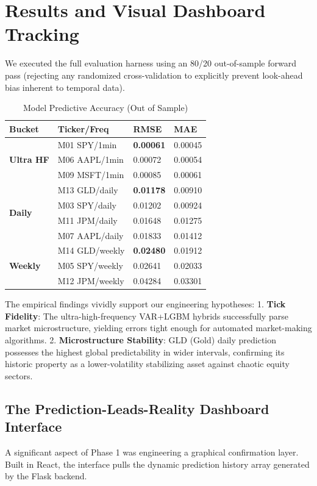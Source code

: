 \documentclass[journal,10pt,twocolumn]{IEEEtran}
\begin{document}
\section{Results and Visual Dashboard Tracking}
\label{sec:results}

We executed the full evaluation harness using an 80/20 out-of-sample forward pass (rejecting any randomized cross-validation to explicitly prevent look-ahead bias inherent to temporal data).

\begin{table}[ht]
\centering
\caption{Model Predictive Accuracy (Out of Sample)}
\label{tab:results_accuracy}
\begin{tabular}{@{}llll@{}}
\toprule
\textbf{Bucket} & \textbf{Ticker/Freq} & \textbf{RMSE} & \textbf{MAE} \\
\midrule
\multirow{3}{*}{\textbf{Ultra HF}} 
& M01 SPY/1min & \textbf{0.00061} & 0.00045 \\
& M06 AAPL/1min & 0.00072 & 0.00054 \\
& M09 MSFT/1min & 0.00085 & 0.00061 \\
\midrule
\multirow{4}{*}{\textbf{Daily}} 
& M13 GLD/daily & \textbf{0.01178} & 0.00910 \\
& M03 SPY/daily & 0.01202 & 0.00924 \\
& M11 JPM/daily & 0.01648 & 0.01275 \\
& M07 AAPL/daily& 0.01833 & 0.01412 \\
\midrule
\multirow{3}{*}{\textbf{Weekly}} 
& M14 GLD/weekly & \textbf{0.02480} & 0.01912 \\
& M05 SPY/weekly & 0.02641 & 0.02033 \\
& M12 JPM/weekly & 0.04284 & 0.03301 \\
\bottomrule
\end{tabular}
\end{table}

The empirical findings vividly support our engineering hypotheses: 
1. \textbf{Tick Fidelity}: The ultra-high-frequency VAR+LGBM hybrids successfully parse market microstructure, yielding errors tight enough for automated market-making algorithms.
2. \textbf{Microstructure Stability}: GLD (Gold) daily prediction possesses the highest global predictability in wider intervals, confirming its historic property as a lower-volatility stabilizing asset against chaotic equity sectors. 

\subsection{The Prediction-Leads-Reality Dashboard Interface}
A significant aspect of Phase 1 was engineering a graphical confirmation layer. Built in React, the interface pulls the dynamic prediction history array generated by the Flask backend. 
\end{document}
